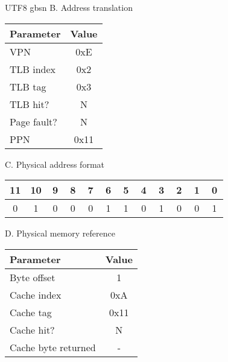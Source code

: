 \documentclass {article}
\begin{document}
\begin {CJK*} {UTF8} {gbsn}
				B. Address translation
				\begin{table}[!htbp]
					\begin{tabular}{lc}
						Parameter   & Value \\ \hline
						VPN         & 0xE   \\
						TLB index   & 0x2   \\
						TLB tag     & 0x3   \\
						TLB hit?    & N     \\
						Page fault? & N     \\
						PPN         & 0x11 
					\end{tabular}
				\end{table}

				C. Physical address format
				\begin{table}[!htbp]
					\begin{tabular}{cccccccccccc}
						11                     & 10                     & 9                      & 8                      & 7                      & 6                      & 5                      & 4                      & 3                      & 2                      & 1                      & 0                      \\ \hline
						\multicolumn{1}{|c|}{\,0\,} & \multicolumn{1}{c|}{\,1\,} & \multicolumn{1}{c|}{\,0\,} & \multicolumn{1}{c|}{\,0\,} & \multicolumn{1}{c|}{\,0\,} & \multicolumn{1}{c|}{\,1\,} & \multicolumn{1}{c|}{\,1\,} & \multicolumn{1}{c|}{\,0\,} & \multicolumn{1}{c|}{\,1\,} & \multicolumn{1}{c|}{\,0\,} & \multicolumn{1}{c|}{\,0\,} & \multicolumn{1}{c|}{\,1\,} \\ \hline
					\end{tabular}
				\end{table}

				D. Physical memory reference
				\begin{table}[!htbp]
					\begin{tabular}{lc}
						Parameter           & Value \\ \hline
						Byte offset         & 1     \\
						Cache index         & 0xA   \\
						Cache tag           & 0x11  \\
						Cache hit?          & N     \\
						Cache byte returned & -    
					\end{tabular}
				\end{table}

			\newpage


\end{CJK*}
\end{document}

